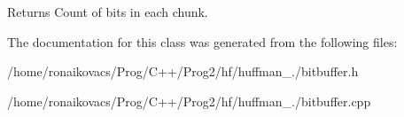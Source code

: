 \begin{DoxyReturn}{Returns}
Count of bits in each chunk. 
\end{DoxyReturn}


The documentation for this class was generated from the following files\+:\begin{DoxyCompactItemize}
\item 
/home/ronaikovacs/\+Prog/\+C++/\+Prog2/hf/huffman\+\_./bitbuffer.\+h\item 
/home/ronaikovacs/\+Prog/\+C++/\+Prog2/hf/huffman\+\_./bitbuffer.\+cpp\end{DoxyCompactItemize}
